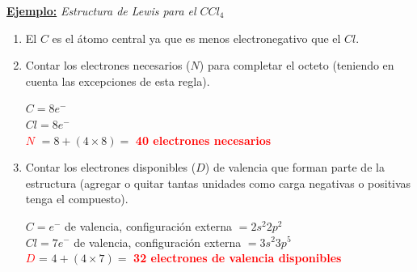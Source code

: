         \begin{center} \textbf{\underline{Ejemplo:}} \textit{Estructura de Lewis para el $CCl_4$} \end{center}
        \begin{enumerate} 
            \item El $C$ es el átomo central ya que es menos electronegativo que el $Cl$. 
            \item Contar los electrones necesarios ($N$) para completar el octeto (teniendo en cuenta las excepciones de esta regla).
                \begin{center} 
                    $C = 8 e^-$ \\[5pt]
                    $Cl = 8 e^-$ \\[5pt]
                    \textcolor{red}{\textbf{$N$}} $= 8 + (4 \times 8) = $ \textcolor{red}{\textbf{40 electrones necesarios}}
                \end{center}
            \item Contar los electrones disponibles ($D$) de valencia que forman parte de la estructura (agregar o quitar tantas unidades como carga negativas o positivas tenga el compuesto).
                \begin{center} 
                    $C = e^-$ de valencia, configuración externa $= 2s^2 2p^2$ \\[10pt]
                    $Cl = 7 e^-$  de valencia, configuración externa $= 3s^2 3p^5$ \\[10pt]
                    \textcolor{red}{\textbf{$D$}} = $4 + (4 \times 7) =$ \textcolor{red}{\textbf{32 electrones de valencia disponibles}}
                \end{center}


\end{enumerate}
